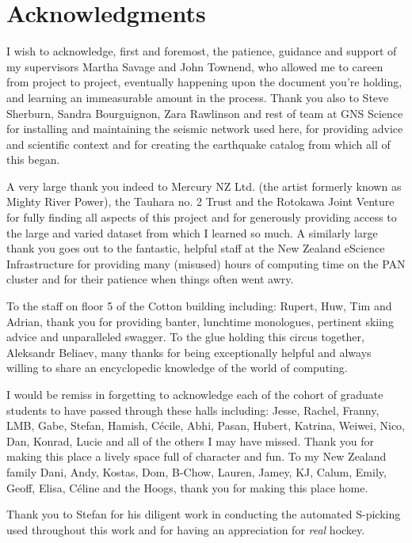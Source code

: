 \chapter*{Acknowledgments}
I wish to acknowledge, first and foremost, the patience, guidance and support of my supervisors Martha Savage and John Townend, who allowed me to careen from project to project, eventually happening upon the document you're holding, and learning an immeasurable amount in the process. Thank you also to Steve Sherburn, Sandra Bourguignon, Zara Rawlinson and rest of team at GNS Science for installing and maintaining the seismic network used here, for providing advice and scientific context and for creating the earthquake catalog from which all of this began.

A very large thank you indeed to Mercury NZ Ltd. (the artist formerly known as Mighty River Power), the Tauhara no. 2 Trust and the Rotokawa Joint Venture for fully finding all aspects of this project and for generously providing access to the large and varied dataset from which I learned so much. A similarly large thank you goes out to the fantastic, helpful staff at the New Zealand eScience Infrastructure for providing many (misused) hours of computing time on the PAN cluster and for their patience when things often went awry.

To the staff on floor 5 of the Cotton building including: Rupert, Huw, Tim and Adrian, thank you for providing banter, lunchtime monologues, pertinent skiing advice and unparalleled swagger. To the glue holding this circus together, Aleksandr Beliaev, many thanks for being exceptionally helpful and always willing to share an encyclopedic knowledge of the world of computing.

I would be remiss in forgetting to acknowledge each of the cohort of graduate students to have passed through these halls including: Jesse, Rachel, Franny, LMB, Gabe, Stefan, Hamish, C\'{e}cile, Abhi, Pasan, Hubert, Katrina, Weiwei, Nico, Dan, Konrad, Lucie and all of the others I may have missed. Thank you for making this place a lively space full of character and fun. To my New Zealand family Dani, Andy, Kostas, Dom, B-Chow, Lauren, Jamey, KJ, Calum, Emily, Geoff, Elisa, C\'{e}line and the Hoogs, thank you for making this place home.

Thank you to Stefan for his diligent work in conducting the automated S-picking used throughout this work and for having an appreciation for \textit{real} hockey.

